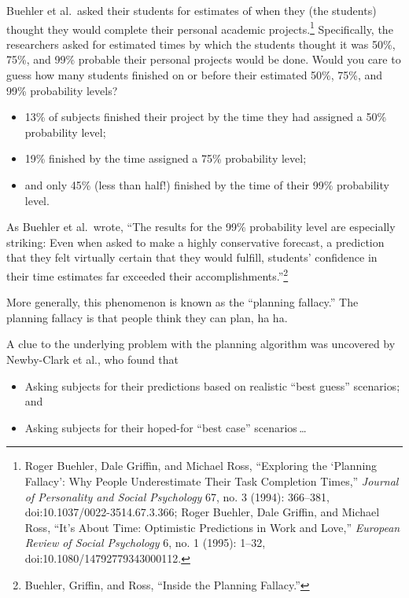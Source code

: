{
 Buehler et al.~asked their students for estimates of when they
(the students) thought they would complete their personal academic
projects.\footnote{Roger Buehler, Dale Griffin, and Michael Ross,
``Exploring the `Planning
Fallacy': Why People Underestimate Their Task
Completion Times,'' \textit{Journal of Personality
and Social Psychology} 67, no. 3 (1994): 366--381,
doi:10.1037/0022-3514.67.3.366; Roger Buehler, Dale Griffin, and
Michael Ross, ``It's About Time:
Optimistic Predictions in Work and Love,''
\textit{European Review of Social Psychology} 6, no. 1 (1995): 1--32,
doi:10.1080/14792779343000112.} Specifically, the researchers asked for
estimated times by which the students thought it was 50\%, 75\%, and
99\% probable their personal projects would be done. Would you care to
guess how many students finished on or before their estimated 50\%,
75\%, and 99\% probability levels?}

\begin{itemize}
\item {
 13\% of subjects finished their project by the time they had
assigned a 50\% probability level;}

\item {
 19\% finished by the time assigned a 75\% probability level;}

\item {
 and only 45\% (less than half!) finished by the time of their 99\%
 probability level.}
\end{itemize}

{
 As Buehler et al.~wrote, ``The results for the
99\% probability level are especially striking: Even when asked to make
a highly conservative forecast, a prediction that they felt virtually
certain that they would fulfill, students' confidence
in their time estimates far exceeded their
accomplishments.''\footnote{Buehler, Griffin, and Ross, ``Inside the
Planning Fallacy.''}}

{
 More generally, this phenomenon is known as the
``planning fallacy.'' The planning
fallacy is that people think they can plan, ha ha.}

{
 A clue to the underlying problem with the planning algorithm was
uncovered by Newby-Clark et al., who found that}

\begin{itemize}
\item {
 Asking subjects for their predictions based on realistic
``best guess'' scenarios; and}

\item {
 Asking subjects for their hoped-for ``best
 case'' scenarios\,\ldots}
\end{itemize}

